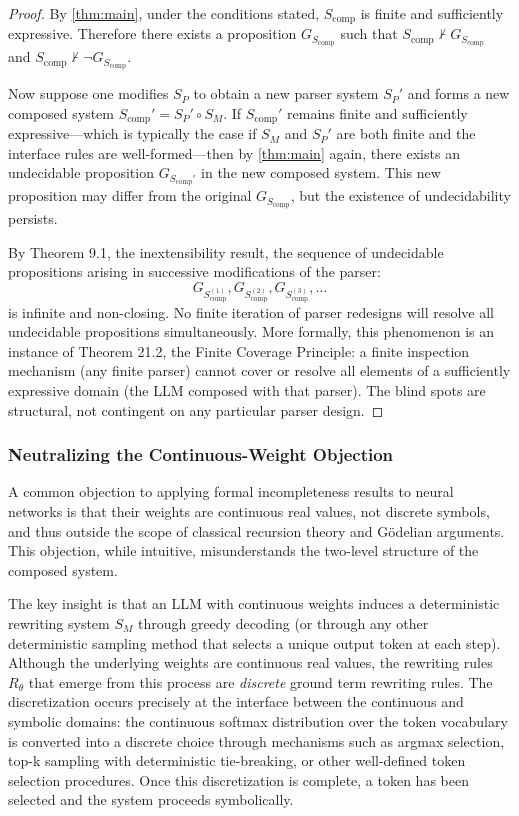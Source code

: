 \documentclass[11pt]{article}
\begin{document}
\begin{proof}
By \ref{thm:main}, under the conditions stated, $S_{\text{comp}}$ is finite and sufficiently expressive. Therefore there exists a proposition $G_{S_{\text{comp}}}$ such that $S_{\text{comp}} \not\vdash G_{S_{\text{comp}}}$ and $S_{\text{comp}} \not\vdash \neg G_{S_{\text{comp}}}$.

Now suppose one modifies $S_P$ to obtain a new parser system $S_P'$ and forms a new composed system $S_{\text{comp}}' = S_P' \circ S_M$. If $S_{\text{comp}}'$ remains finite and sufficiently expressive—which is typically the case if $S_M$ and $S_P'$ are both finite and the interface rules are well-formed—then by \ref{thm:main} again, there exists an undecidable proposition $G_{S_{\text{comp}}'}$ in the new composed system. This new proposition may differ from the original $G_{S_{\text{comp}}}$, but the existence of undecidability persists.

By Theorem 9.1, the inextensibility result, the sequence of undecidable propositions arising in successive modifications of the parser:
\begin{equation}
G_{S_{\text{comp}}^{(1)}}, G_{S_{\text{comp}}^{(2)}}, G_{S_{\text{comp}}^{(3)}}, \ldots
\end{equation}
is infinite and non-closing. No finite iteration of parser redesigns will resolve all undecidable propositions simultaneously. More formally, this phenomenon is an instance of Theorem 21.2, the Finite Coverage Principle: a finite inspection mechanism (any finite parser) cannot cover or resolve all elements of a sufficiently expressive domain (the LLM composed with that parser). The blind spots are structural, not contingent on any particular parser design.
\end{proof}


\subsubsection{Neutralizing the Continuous-Weight Objection}

A common objection to applying formal incompleteness results to neural networks is that their weights are continuous real values, not discrete symbols, and thus outside the scope of classical recursion theory and Gödelian arguments. This objection, while intuitive, misunderstands the two-level structure of the composed system.

The key insight is that an LLM with continuous weights induces a deterministic rewriting system $S_M$ through greedy decoding (or through any other deterministic sampling method that selects a unique output token at each step). Although the underlying weights are continuous real values, the rewriting rules $R_\theta$ that emerge from this process are \textit{discrete} ground term rewriting rules. The discretization occurs precisely at the interface between the continuous and symbolic domains: the continuous softmax distribution over the token vocabulary is converted into a discrete choice through mechanisms such as argmax selection, top-k sampling with deterministic tie-breaking, or other well-defined token selection procedures. Once this discretization is complete, a token has been selected and the system proceeds symbolically.
\end{document}
